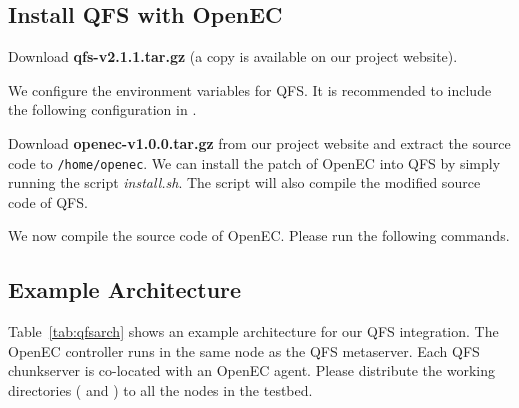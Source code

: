 \documentclass[letterpaper,12pt]{article}
\newcommand{\openec}{{\sf\small OpenEC}\xspace}
\begin{document}
\subsection{Install QFS with OpenEC}

Download {\bf qfs-v2.1.1.tar.gz} (a copy is available on our project website).

\begin{center}
\noindent{}
\end{center}

We configure the environment variables for QFS. It is recommended to include
the following configuration in .

\begin{center}
\noindent{}
\end{center}

Download {\bf openec-v1.0.0.tar.gz} from our project website and extract the
source code to {\tt /home/openec}.  We can install the patch of \openec into
QFS by simply running the script {\sl install.sh}.  The script will also
compile the modified source code of QFS.

\begin{center}
\noindent{}
\end{center}

We now compile the source code of OpenEC. Please run the following commands.

\begin{center}
\noindent{}
\end{center}

\subsection{Example Architecture}

Table~\ref{tab:qfsarch} shows an example architecture for our QFS integration.
The \openec controller runs in the same node as the QFS metaserver.
Each QFS chunkserver is co-located with an \openec agent. Please distribute
the working directories ( and ) to all 
the nodes in the testbed.
\end{document}
